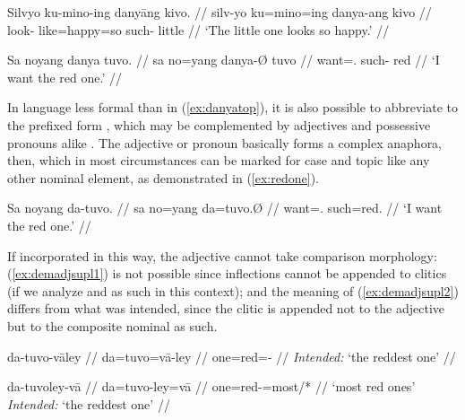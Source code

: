 \pex
\a\begingl
	\gla Silvyo ku-mino-ing danyāng kivo. //
	\glb silv-yo ku=mino=ing danya-ang kivo //
	\glc look-\TsgN{} like=happy=so such-\Aarg{} little //
	\glft `The little one looks so happy.' //
\endgl

\a\label{ex:danyatop}\begingl
	\gla Sa noyang danya tuvo. //
	\glb sa no=yang danya-Ø tuvo //
	\glc \PatT{} want=\Fsg{}.\Aarg{} such-\Top{} red //
	\glft `I want the red one.' //
\endgl

\xe


In language less formal than in (\ref{ex:danyatop}), it is also possible to 
abbreviate  to the prefixed form , which may be 
complemented by adjectives and possessive pronouns alike%
. The adjective or pronoun basically forms a complex anaphora, then, which in
most circumstances can be marked for case and topic like any other nominal
element, as demonstrated in (\ref{ex:redone}).

\ex\label{ex:redone}\begingl
	\gla Sa noyang da-tuvo. //
	\glb sa no=yang da=tuvo.Ø //
	\glc \PatT{} want=\Fsg{}.\Aarg{} such=red.\Top{} //
	\glft `I want the red one.' //
\endgl\xe

If incorporated in this way, the adjective cannot take comparison morphology:
(\ref{ex:demadjsupl1}) is not possible since inflections cannot be appended to
clitics (if we analyze  and  as such in this
context); and the meaning of (\ref{ex:demadjsupl2}) differs from what was
intended, since the  clitic is appended not to the adjective
but to the composite nominal as such.

\pex
\a\label{ex:demadjsupl1}\ljudge*\begingl
	\gla da-tuvo-vāley //
	\glb da=tuvo=vā-ley //
	\glc one=red=\Supl{}-\PargI{} //
	\glft \textit{Intended:} `the reddest one' //
\endgl

\a\label{ex:demadjsupl2}\ljudge\excl\begingl
	\gla da-tuvoley-vā //
	\glb da=tuvo-ley=vā //
	\glc one=red-\PargI{}=most/*\Supl{} //
	\glft `most red ones' \\
		\textit{Intended:} `the reddest one' //
\endgl

